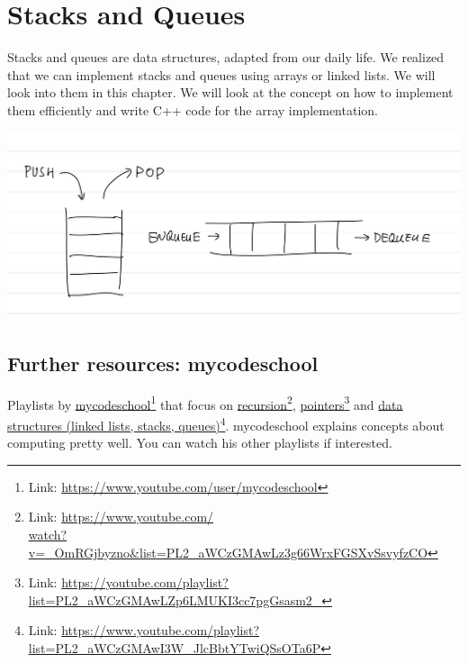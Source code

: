 \chapter{Stacks and Queues}

Stacks and queues are data structures, adapted from our daily life. We realized that we can implement stacks and queues using arrays or linked lists. We will look into them in this chapter. We will look at the concept on how to implement them efficiently and write C++ code for the array implementation.

\includegraphics[width=16cm]{images/ch6-stackqueue.png}

\section{Further resources: mycodeschool}

Playlists by 
\href{https://www.youtube.com/user/mycodeschool}{mycodeschool}\footnote{Link: \href{https://www.youtube.com/user/mycodeschool}{https://www.youtube.com/user/mycodeschool}}
that focus on 
\href{https://www.youtube.com/watch?v=_OmRGjbyzno&list=PL2_aWCzGMAwLz3g66WrxFGSXvSsvyfzCO}{recursion}\footnote{Link: \href{https://www.youtube.com/watch?v=_OmRGjbyzno&list=PL2_aWCzGMAwLz3g66WrxFGSXvSsvyfzCO}{https://www.youtube.com/\\watch?v=\_OmRGjbyzno\&list=PL2\_aWCzGMAwLz3g66WrxFGSXvSsvyfzCO}}, 
\href{https://youtube.com/playlist?list=PL2_aWCzGMAwLZp6LMUKI3cc7pgGsasm2_}{pointers}\footnote{Link: \href{https://youtube.com/playlist?list=PL2_aWCzGMAwLZp6LMUKI3cc7pgGsasm2_}{https://youtube.com/playlist?list=PL2\_aWCzGMAwLZp6LMUKI3cc7pgGsasm2\_}} and 
\href{https://www.youtube.com/playlist?list=PL2_aWCzGMAwI3W_JlcBbtYTwiQSsOTa6P}{data structures (linked lists, stacks, queues)}\footnote{Link: \href{https://www.youtube.com/playlist?list=PL2_aWCzGMAwI3W_JlcBbtYTwiQSsOTa6P}{https://www.youtube.com/playlist?list=PL2\_aWCzGMAwI3W\_JlcBbtYTwiQSsOTa6P}}.
mycodeschool explains concepts about computing pretty well. You can watch his other playlists if interested.

